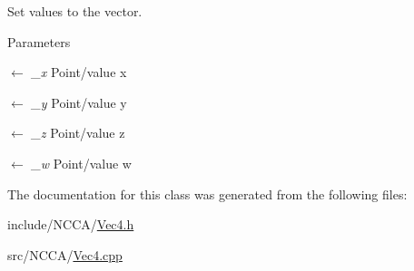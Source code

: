 Set values to the vector. 
\begin{DoxyParams}{Parameters}
\item[\mbox{$\leftarrow$} {\em \_\-x}]Point/value x \item[\mbox{$\leftarrow$} {\em \_\-y}]Point/value y \item[\mbox{$\leftarrow$} {\em \_\-z}]Point/value z \item[\mbox{$\leftarrow$} {\em \_\-w}]Point/value w \end{DoxyParams}


The documentation for this class was generated from the following files:\begin{DoxyCompactItemize}
\item 
include/NCCA/\hyperlink{Vec4_8h}{Vec4.h}\item 
src/NCCA/\hyperlink{Vec4_8cpp}{Vec4.cpp}\end{DoxyCompactItemize}
